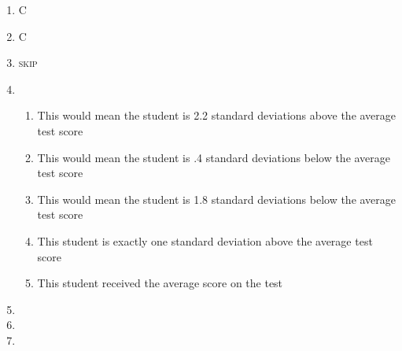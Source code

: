 \documentclass[12pt]{article}
\begin{document}
\begin{enumerate}
  \item C

  \item C

  \item \textsc{skip}

  \item

    \begin{enumerate}

      \item This would mean the student is 2.2 standard deviations above the average test score

      \item This would mean the student is .4 standard deviations below the average test score

      \item This would mean the student is 1.8 standard deviations below the average test score

      \item This student is exactly one standard deviation above the average test score

      \item This student received the average score on the test

    \end{enumerate}

  \item

  \item

  \item

\end{enumerate}
\end{document}
